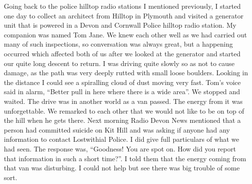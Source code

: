 Going back to the police hilltop radio stations I mentioned previously, I
started one day to collect an architect from Hilltop in Plymouth and visited a
generator unit that is powered in a Devon and Cornwall Police hilltop radio
station. My companion was named Tom Jane. We knew each other well as we had
carried out many of such inspections, so conversation was always great, but a
happening occurred which affected both of us after we looked at the generator
and started our quite long descent to return. I was driving quite slowly so as
not to cause damage, as the path was very deeply rutted with small loose
boulders. Looking in the distance I could see a spiralling cloud of dust moving
very fast. Tom's voice said in alarm, ``Better pull in here where there is a
wide area''. We stopped and waited. The drive was in another world as a van
passed. The energy from it was unforgettable. We remarked to each other that we
would not like to be on top of the hill when he gets there. Next morning Radio
Devon News mentioned that a person had committed suicide on Kit Hill and was
asking if anyone had any information to contact Lostwithial Police. I did give
full particulars of what we had seen. The response was, ``Goodness! You are
spot on. How did you report that information in such a short time?''. I told
them that the energy coming from that van was disturbing. I could not help but
see there was big trouble of some sort.

